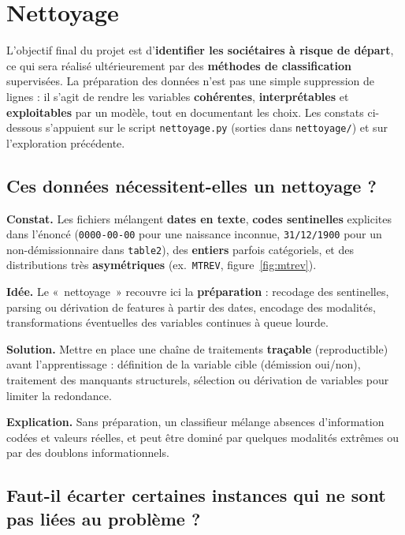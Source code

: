 \documentclass[11pt,a4paper]{article}
\begin{document}
\section{Nettoyage}

L'objectif final du projet est d'\textbf{identifier les sociétaires à risque de départ}, ce qui sera réalisé ultérieurement par des \textbf{méthodes de classification} supervisées. La préparation des données n'est pas une simple suppression de lignes : il s'agit de rendre les variables \textbf{cohérentes}, \textbf{interprétables} et \textbf{exploitables} par un modèle, tout en documentant les choix. Les constats ci-dessous s'appuient sur le script \texttt{nettoyage.py} (sorties dans \texttt{nettoyage/}) et sur l'exploration précédente.

\subsection{Ces données nécessitent-elles un nettoyage ?}

\textbf{Constat.} Les fichiers mélangent \textbf{dates en texte}, \textbf{codes sentinelles} explicites dans l'énoncé (\texttt{0000-00-00} pour une naissance inconnue, \texttt{31/12/1900} pour un non-démissionnaire dans \texttt{table2}), des \textbf{entiers} parfois catégoriels, et des distributions très \textbf{asymétriques} (ex.\ \texttt{MTREV}, figure~\ref{fig:mtrev}).

\textbf{Idée.} Le «~nettoyage~» recouvre ici la \textbf{préparation} : recodage des sentinelles, parsing ou dérivation de features à partir des dates, encodage des modalités, transformations éventuelles des variables continues à queue lourde.

\textbf{Solution.} Mettre en place une chaîne de traitements \textbf{traçable} (reproductible) avant l'apprentissage : définition de la variable cible (démission oui/non), traitement des manquants structurels, sélection ou dérivation de variables pour limiter la redondance.

\textbf{Explication.} Sans préparation, un classifieur mélange absences d'information codées et valeurs réelles, et peut être dominé par quelques modalités extrêmes ou par des doublons informationnels.

\subsection{Faut-il écarter certaines instances qui ne sont pas liées au problème ?}
\end{document}
